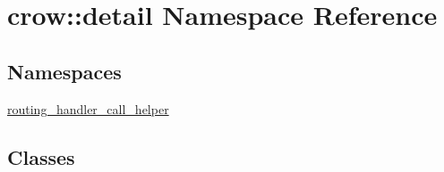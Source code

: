 \hypertarget{namespacecrow_1_1detail}{\section{crow\-:\-:detail Namespace Reference}
\label{namespacecrow_1_1detail}
}
\subsection*{Namespaces}
\begin{DoxyCompactItemize}
\item 
\hyperlink{namespacecrow_1_1detail_1_1routing__handler__call__helper}{routing\-\_\-handler\-\_\-call\-\_\-helper}
\end{DoxyCompactItemize}
\subsection*{Classes}

